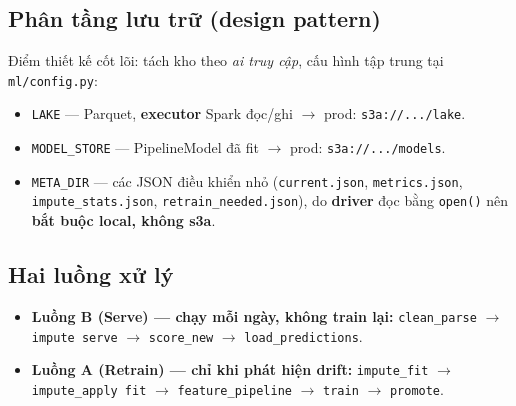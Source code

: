 \documentclass[12pt,a4paper]{article}
\begin{document}
\subsection{Phân tầng lưu trữ (design pattern)}
Điểm thiết kế cốt lõi: tách kho theo \textit{ai truy cập}, cấu hình tập trung tại \texttt{ml/config.py}:
\begin{itemize}[nosep]
  \item \texttt{LAKE} --- Parquet, \textbf{executor} Spark đọc/ghi $\rightarrow$ prod: \texttt{s3a://.../lake}.
  \item \texttt{MODEL\_STORE} --- PipelineModel đã fit $\rightarrow$ prod: \texttt{s3a://.../models}.
  \item \texttt{META\_DIR} --- các JSON điều khiển nhỏ (\texttt{current.json}, \texttt{metrics.json}, \texttt{impute\_stats.json}, \texttt{retrain\_needed.json}), do \textbf{driver} đọc bằng \texttt{open()} nên \textbf{bắt buộc local, không s3a}.
\end{itemize}

\subsection{Hai luồng xử lý}
\begin{itemize}[nosep]
  \item \textbf{Luồng B (Serve) --- chạy mỗi ngày, không train lại:} \texttt{clean\_parse} $\rightarrow$ \texttt{impute serve} $\rightarrow$ \texttt{score\_new} $\rightarrow$ \texttt{load\_predictions}.
  \item \textbf{Luồng A (Retrain) --- chỉ khi phát hiện drift:} \texttt{impute\_fit} $\rightarrow$ \texttt{impute\_apply fit} $\rightarrow$ \texttt{feature\_pipeline} $\rightarrow$ \texttt{train} $\rightarrow$ \texttt{promote}.
\end{itemize}
\end{document}
